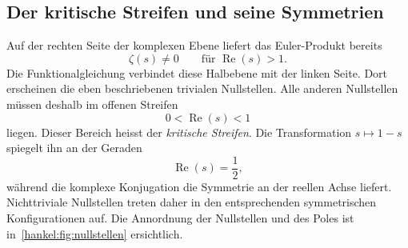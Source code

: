 \subsection{Der kritische Streifen und seine Symmetrien
\label{hankel:subsection:kritischer-streifen}}

Auf der rechten Seite der komplexen Ebene liefert das Euler-Produkt bereits
\begin{equation}
\zeta(s)\neq0
\qquad
\text{für }\operatorname{Re}(s)>1.
\label{hankel:eq:nullstellenfreie-halbebene-rechts}
\end{equation}
Die Funktionalgleichung verbindet diese Halbebene mit der linken Seite. 
Dort erscheinen die eben beschriebenen trivialen Nullstellen. Alle anderen Nullstellen müssen deshalb im offenen Streifen
\begin{equation}
0<\operatorname{Re}(s)<1
\label{hankel:eq:kritischer-streifen}
\end{equation}
liegen. 
Dieser Bereich heisst der \emph{kritische Streifen}. 
Die Transformation $s\mapsto1-s$ spiegelt ihn an der Geraden
\begin{equation}
\operatorname{Re}(s)=\frac{1}{2},
\label{hankel:eq:kritische-gerade}
\end{equation}
während die komplexe Konjugation die Symmetrie an der reellen Achse liefert.
Nichttriviale Nullstellen treten daher in den entsprechenden symmetrischen Konfigurationen auf.
Die Annordnung der Nullstellen und des Poles ist in~\ref{hankel:fig:nullstellen} ersichtlich.

